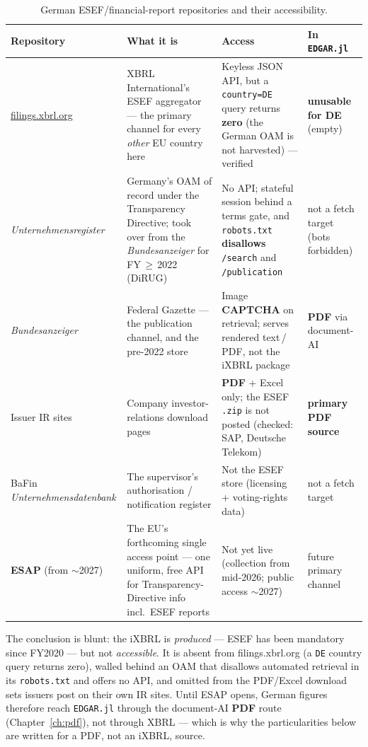\documentclass[11pt,a4paper]{report}
\begin{document}
\begin{table}[h]
\centering
\small
\caption{German ESEF/financial-report repositories and their accessibility.}
\label{tab:de-repos}
\begin{tabular}{@{}p{}p{}p{}p{}@{}}
\toprule
\textbf{Repository} & \textbf{What it is} & \textbf{Access} & \textbf{In \texttt{EDGAR.jl}} \\
\midrule
\href{https://filings.xbrl.org}{filings.xbrl.org} & XBRL International's ESEF aggregator --- the primary channel for every \emph{other} EU country here & Keyless JSON API, but a \texttt{country=DE} query returns \textbf{zero} (the German OAM is not harvested) --- verified & \textbf{unusable for DE} (empty) \\
\emph{Unternehmens\-register} & Germany's OAM of record under the Transparency Directive; took over from the \emph{Bundesanzeiger} for FY\,$\geq$\,2022 (DiRUG) & No API; stateful session behind a terms gate, and \texttt{robots.txt} \textbf{disallows} \texttt{/search} and \texttt{/publication} & not a fetch target (bots forbidden) \\
\emph{Bundesanzeiger} & Federal Gazette --- the publication channel, and the pre-2022 store & Image \textbf{CAPTCHA} on retrieval; serves rendered text\,/\,PDF, not the iXBRL package & \textbf{PDF} via document-AI \\
Issuer IR sites & Company investor-relations download pages & \textbf{PDF} + Excel only; the ESEF \texttt{.zip} is not posted (checked: SAP, Deutsche Telekom) & \textbf{primary PDF source} \\
BaFin \emph{Unternehmens\-datenbank} & The supervisor's authorisation / notification register & Not the ESEF store (licensing + voting-rights data) & not a fetch target \\
\textbf{ESAP} (from $\sim$2027) & The EU's forthcoming single access point --- one uniform, free API for Transparency-Directive info incl.\ ESEF reports & Not yet live (collection from mid-2026; public access $\sim$2027) & future primary channel \\
\bottomrule
\end{tabular}
\end{table}

\noindent The conclusion is blunt: the iXBRL is \emph{produced} --- ESEF has been mandatory since FY2020 ---
but not \emph{accessible}. It is absent from filings.xbrl.org (a \texttt{DE} country query returns zero),
walled behind an OAM that disallows automated retrieval in its \texttt{robots.txt} and offers no API, and
omitted from the PDF/Excel download sets issuers post on their own IR sites. Until ESAP opens, German figures
therefore reach \texttt{EDGAR.jl} through the document-AI \textbf{PDF} route (Chapter~\ref{ch:pdf}), not
through XBRL --- which is why the particularities below are written for a PDF, not an iXBRL, source.
\end{document}
